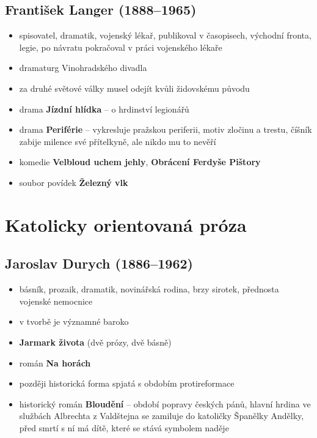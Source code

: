 \subsection{František Langer (1888--1965)}
\begin{itemize}
\item spisovatel, dramatik, vojenský lékař, publikoval v časopisech, východní fronta, legie, po návratu pokračoval v práci vojenského lékaře
\item dramaturg Vinohradského divadla
\item za druhé světové války musel odejít kvůli židovskému původu
\item drama \textbf{Jízdní hlídka} -- o hrdinství legionářů
\item drama \textbf{Periférie} -- vykresluje pražskou periferii, motiv zločinu a trestu, číšník zabije milence své přítelkyně, ale nikdo mu to nevěří
\item komedie \textbf{Velbloud uchem jehly}, \textbf{Obrácení Ferdyše Pištory}
\item soubor povídek \textbf{Železný vlk}
\end{itemize}

\section{Katolicky orientovaná próza}

\subsection{Jaroslav Durych (1886--1962)}
\begin{itemize}
\item básník, prozaik, dramatik, novinářská rodina, brzy sirotek, přednosta vojenské nemocnice 
\item v tvorbě je významné baroko
\item \textbf{Jarmark života} (dvě prózy, dvě básně)
\item román \textbf{Na horách}
\item později historická forma spjatá s obdobím protireformace
\item historický román \textbf{Bloudění} -- období popravy českých pánů, hlavní hrdina ve službách Albrechta z Valdštejna se zamiluje do katoličky Španělky Andělky, před smrtí s ní má dítě, které se stává symbolem naděje
\end{itemize}

